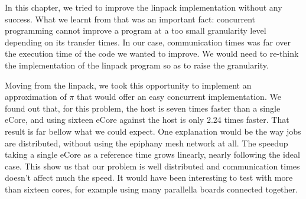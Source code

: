 In this chapter, we tried to improve the linpack implementation without any success. What we learnt from that was an important fact: concurrent programming cannot improve a program at a too small granularity level depending on its transfer times. In our case, communication times was far over the execution time of the code we wanted to improve. We would need to re-think the implementation of the linpack program so as to raise the granularity.

Moving from the linpack, we took this opportunity to implement an approximation of $\pi$ that would offer an easy concurrent implementation. We found out that, for this problem, the host is seven times faster than a single \gls{eCore}, and using sixteen \gls{eCore} against the host is only 2.24 times faster. That result is far bellow what we could expect. One explanation would be the way jobs are distributed, without using the \gls{epiphany} mesh network at all. The speedup taking a single \gls{eCore} as a reference time grows linearly, nearly following the ideal case. This show us that our problem is well distributed and communication times doesn't affect much the speed. It would have been interesting to test with more than sixteen cores, for example using many parallella boards connected together.